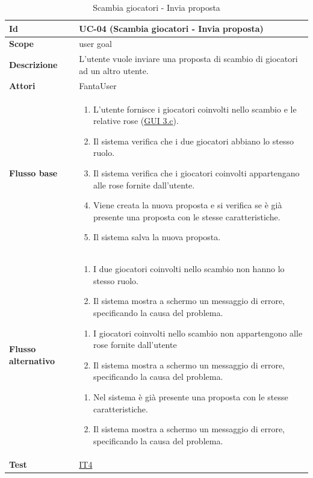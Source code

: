 \begin{table}[H]
\caption{Scambia giocatori - Invia proposta}
\label{UC-04}

\begin{tabularx}{\textwidth}{|l|X|}
\hline
\textbf{Id} & UC-04 (Scambia giocatori - Invia proposta) \\
\hline
\textbf{Scope} & user goal \\
\hline
\textbf{Descrizione} & L'utente vuole inviare una proposta di scambio di giocatori ad un altro utente. \\
\hline
\textbf{Attori} & FantaUser \\
\hline
\textbf{Flusso base} &
\begin{enumerate}[leftmargin=*]
    \item L'utente fornisce i giocatori coinvolti nello scambio e le relative rose (\hyperref[fig:mockup_parte3]{GUI 3.c}).
    \item Il sistema verifica che i due giocatori abbiano lo stesso ruolo.
    \item Il sistema verifica che i giocatori coinvolti appartengano alle rose fornite dall'utente.
    \item Viene creata la nuova proposta e si verifica se è già presente una 
            proposta con le stesse caratteristiche.
    \item Il sistema salva la nuova proposta.
\end{enumerate} \\
\hline
\textbf{Flusso alternativo} &
\begin{enumerate}[leftmargin=*,label=2.\arabic*]
    \item I due giocatori coinvolti nello scambio non hanno lo stesso ruolo.
    \item Il sistema mostra a schermo un messaggio di errore, specificando la causa del problema.
\end{enumerate}
\begin{enumerate}[leftmargin=*,label=3.\arabic*]
    \item I giocatori coinvolti nello scambio non appartengono alle rose fornite dall'utente
    \item Il sistema mostra a schermo un messaggio di errore, specificando la causa del problema.
\end{enumerate} 
\begin{enumerate}[leftmargin=*,label=4.\arabic*]
    \item Nel sistema è già presente una proposta con le stesse caratteristiche.
    \item Il sistema mostra a schermo un messaggio di errore, specificando la causa del problema.
\end{enumerate} \\
\hline
\textbf{Test} & \hyperref[IT4]{IT4} \\
\hline
\end{tabularx}

\end{table}



